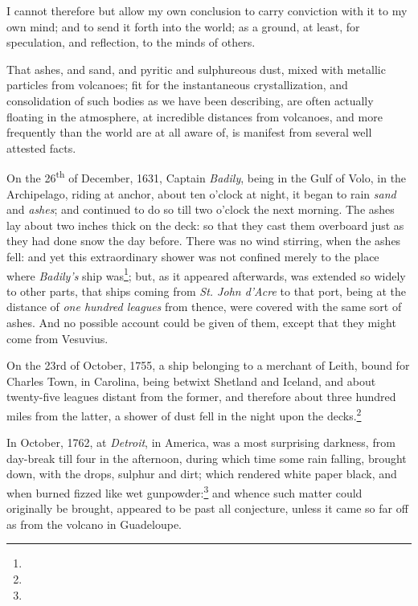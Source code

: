 \documentclass[a4paper, 12pt, oneside]{article}
\begin{document}
I cannot therefore but allow my own conclusion to carry conviction with it to my own mind; and to send it forth into the world; as a ground, at least, for speculation, and reflection, to the minds of others.

That ashes, and sand, and pyritic and sulphureous dust, mixed with metallic particles from volcanoes; fit for the instantaneous crystallization, and consolidation of such bodies as we have been describing, are often actually floating in the atmosphere, at incredible distances from volcanoes, and more frequently than the world are at all aware of, is manifest from several well attested facts.

On the 26\textsuperscript{th} of December, 1631, Captain \emph{Badily}, being in the Gulf of Volo, in the Archipelago, riding at anchor, about ten o'clock at night, it began to rain \emph{sand} and \emph{ashes}; and continued to do so till two o'clock the next morning. The ashes lay about two inches thick on the deck: so that they cast them overboard just as they had done snow the day before. There was no wind stirring, when the ashes fell: and yet this extraordinary shower was not confined merely to the place where \emph{Badily's} ship was\footnote{}; but, as it appeared afterwards, was extended so widely to other parts, that ships coming from \emph{St. John d'Acre} to that port, being at the distance of \emph{one hundred leagues} from thence, were covered with the same sort of ashes. And no possible account could be given of them, except that they might come from Vesuvius.

On the 23rd of October, 1755, a ship belonging to a merchant of Leith, bound for Charles Town, in Carolina, being betwixt Shetland and Iceland, and about twenty-five leagues distant from the former, and therefore about three hundred miles from the latter, a shower of dust fell in the night upon the decks.\footnote{}

In October, 1762, at \emph{Detroit}, in America, was a most surprising darkness, from day-break till four in the afternoon, during which time some rain falling, brought down, with the drops, sulphur and dirt; which rendered white paper black, and when burned fizzed like wet gunpowder:\footnote{} and whence such matter could originally be brought, appeared to be past all conjecture, unless it came so far off as from the volcano in Guadeloupe.
\end{document}
